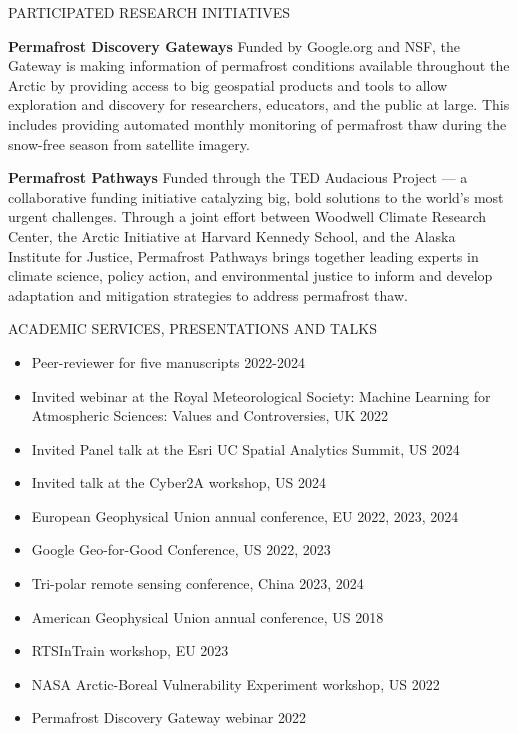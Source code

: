 \documentclass{resume} %
\begin{document}
\begin{rSection}{PARTICIPATED RESEARCH INITIATIVES}

\textbf{Permafrost Discovery Gateways} Funded by Google.org and NSF, the Gateway is making information of permafrost conditions available throughout the Arctic by providing access to big geospatial products and tools to allow exploration and discovery for researchers, educators, and the public at large. This includes providing automated monthly monitoring of permafrost thaw during the snow-free season from satellite imagery.

\textbf{Permafrost Pathways} Funded through the TED Audacious Project — a collaborative funding initiative catalyzing big, bold solutions to the world’s most urgent challenges. Through a joint effort between Woodwell Climate Research Center, the Arctic Initiative at Harvard Kennedy School, and the Alaska Institute for Justice, Permafrost Pathways brings together leading experts in climate science, policy action, and environmental justice to inform and develop adaptation and mitigation strategies to address permafrost thaw.


\end{rSection}
\begin{rSection}{ACADEMIC SERVICES, PRESENTATIONS AND TALKS}
\begin{itemize}
    \item Peer-reviewer for five manuscripts \hfill 2022-2024
    \item Invited webinar at the Royal Meteorological Society: Machine Learning for Atmospheric Sciences: Values and Controversies, UK \hfill 2022
    \item Invited Panel talk at the Esri UC Spatial Analytics Summit, US \hfill 2024
    \item Invited talk at the Cyber2A workshop, US \hfill 2024
    \item European Geophysical Union annual conference, EU \hfill 2022, 2023, 2024
    \item Google Geo-for-Good Conference, US \hfill 2022, 2023
    \item Tri-polar remote sensing conference, China \hfill 2023, 2024
    \item American Geophysical Union annual conference, US \hfill 2018
    \item RTSInTrain workshop, EU \hfill 2023
    \item NASA Arctic-Boreal Vulnerability Experiment workshop, US \hfill 2022
    \item Permafrost Discovery Gateway webinar \hfill 2022
\end{itemize}


\end{rSection}
\end{document}
